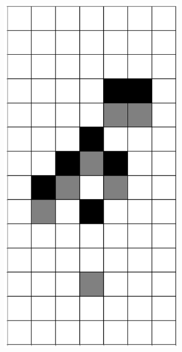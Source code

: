 \documentclass[12pt]{article}
\numberwithin{figure}{section} %
\begin{document}
\begin{figure}[H]
\begin{subfigure}{0.19\textwidth}
     \includegraphics[width=\linewidth]{Section4/16.2}
     \subcaption{}
   \end{subfigure}
           \begin{subfigure}{0.19\textwidth}
     \centering

\end{subfigure}
\end{figure}
\end{document}
